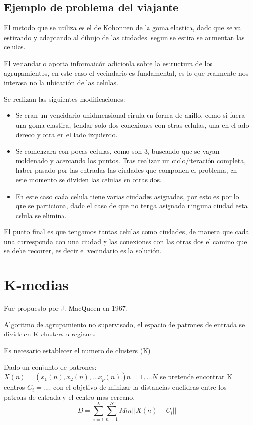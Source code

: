 \documentclass[12pt, twoside, openright]{report} %
\begin{document}
\subsection{Ejemplo de problema del viajante}

El metodo que se utiliza es el de Kohonnen de la goma elastica, dado que se va estirando y adaptando al dibujo de las ciudades, segun se estira se aumentan las celulas.

El veciandario aporta informaicón adicionla sobre la estructura de los agrupamientos, en este caso el vecindario es fundamental, es lo que realmente nos interasa no la ubicación de las celulas.

Se realizan las siguientes modificaciones:
	\begin{itemize}
	
	\item Se cran un vencidario unidmensional cirula en forma de anillo, como si fuera una goma elastica, tendar solo dos conexiones con otras celulas, una en el ado dereco y otra en el lado izquierdo.
	\item Se comenzara con pocas celulas, como son 3, buscando que se vayan moldenado y acercando los puntos. Tras realizar un ciclo/iteración completa, haber pasado por las entradas las ciudades que componen el problema, en este momento se dividen las celulas en otras dos.
	\item En este caso cada celula tiene varias ciudades asignadas, por esto es por lo que se particiona, dado el caso de que no tenga asignada ninguna ciudad esta celula se elimina.
\end{itemize}

El punto final es que tengamos tantas celulas como ciudades, de manera que cada una corresponda con una ciudad y las conexiones con las otras dos el camino que se debe recorrer, es decir el vecindario es la solución.

\section{K-medias}
Fue propuesto por J. MacQueen en 1967.

Algoritmo de agrupamiento no supervisado, el espacio de patrones de entrada se divide en K clusters o regiones.

Es necesario establecer el numero de clusters (K)

Dado un conjunto de patrones: $X(n)=(x_1(n), x_2(n), ...x_p(n)) n=1, ... N$ se pretende encontrar K centros $C_i =....$ con el objetivo de minizar la distancias euclideas entre los patrons de entrada y el centro mas cercano.
$$D=\sum^k_{i=1}\sum^N_{n=1} Min ||X(n) - C_i||$$
\end{document}
